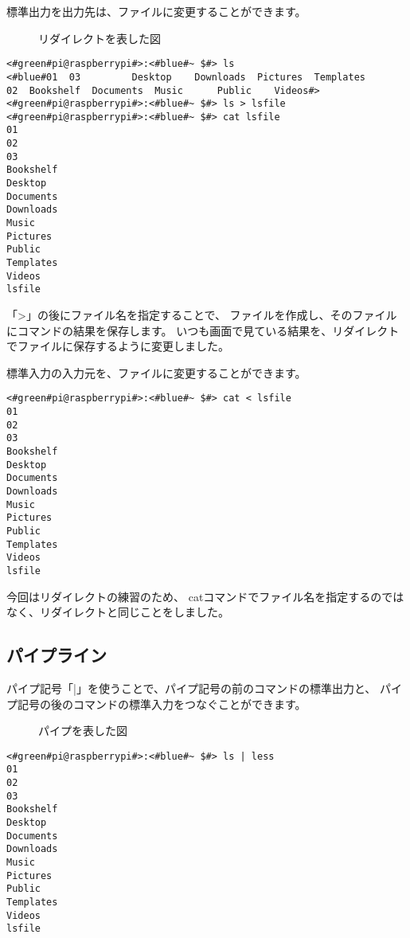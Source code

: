 標準出力を出力先は、ファイルに変更することができます。

\begin{figure}
    \centering
    
    \caption{リダイレクトを表した図}
    \label{ch03:redirect}
\end{figure}


\begin{lstlisting}[caption=lsの出力をリダイレクトする, label=redirectLs]
<#green#pi@raspberrypi#>:<#blue#~ $#> ls 
<#blue#01  03         Desktop    Downloads  Pictures  Templates
02  Bookshelf  Documents  Music      Public    Videos#>
<#green#pi@raspberrypi#>:<#blue#~ $#> ls > lsfile
<#green#pi@raspberrypi#>:<#blue#~ $#> cat lsfile
01
02
03
Bookshelf
Desktop
Documents
Downloads
Music
Pictures
Public
Templates
Videos
lsfile
\end{lstlisting}

「>」の後にファイル名を指定することで、
ファイルを作成し、そのファイルにコマンドの結果を保存します。
いつも画面で見ている結果を、リダイレクトでファイルに保存するように変更しました。


標準入力の入力元を、ファイルに変更することができます。
\begin{lstlisting}[caption=catコマンドにリダイレクトでファイルを入力する, label=redirectCat]
<#green#pi@raspberrypi#>:<#blue#~ $#> cat < lsfile
01
02
03
Bookshelf
Desktop
Documents
Downloads
Music
Pictures
Public
Templates
Videos
lsfile
\end{lstlisting}

今回はリダイレクトの練習のため、
catコマンドでファイル名を指定するのではなく、リダイレクトと同じことをしました。

\subsection{パイプライン}

パイプ記号「|」を使うことで、パイプ記号の前のコマンドの標準出力と、
パイプ記号の後のコマンドの標準入力をつなぐことができます。

\begin{figure}
    \centering
    
    \caption{パイプを表した図}
    \label{ch03:pipe}
\end{figure}


\begin{lstlisting}[caption=lsコマンドの出力をパイプでlessコマンドに渡す, label=redirectCat]
<#green#pi@raspberrypi#>:<#blue#~ $#> ls | less
01
02
03
Bookshelf
Desktop
Documents
Downloads
Music
Pictures
Public
Templates
Videos
lsfile
\end{lstlisting}

